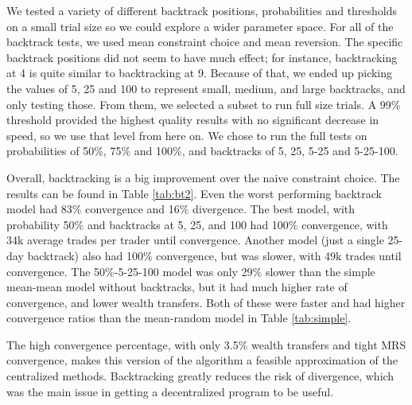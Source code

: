 \documentclass[12pt,a4paper,titlepage]{article}
\newcommand{\co}[1]{\textsf{#1}}
\begin{document}
We tested a variety of different backtrack positions, probabilities and thresholds on a small trial size so we could explore a wider parameter space.
For all of the backtrack tests, we used \co{mean} constraint choice and \co{mean} reversion.
The specific backtrack positions did not seem to have much effect; for instance, backtracking at 4 is quite similar to backtracking at 9. 
Because of that, we ended up picking the values of 5, 25 and 100 to represent small, medium, and large backtracks, and only testing those.
From them, we selected a subset to run full size trials.
A 99\% threshold provided the highest quality results with no significant decrease in speed, so we use that level from here on.
We chose to run the full tests on probabilities of 50\%, 75\% and 100\%, and backtracks of 5, 25, 5-25 and 5-25-100. 

Overall, backtracking is a big improvement over the naive constraint choice.
The results can be found in Table \ref{tab:bt2}.
Even the worst performing backtrack model had 83\% convergence and 16\% divergence.
The best model, with probability 50\% and backtracks at 5, 25, and 100 had 100\% convergence, with 34k average trades per trader until convergence.
Another model (just a single 25-day backtrack) also had 100\% convergence, but was slower, with 49k trades until convergence.
The 50\%-5-25-100 model was only 29\% slower than the simple \co{mean}-\co{mean} model without backtracks, but it had much higher rate of convergence, and lower wealth transfers.
Both of these were faster and had higher convergence ratios than the \co{mean}-\co{random} model in Table \ref{tab:simple}.

The high convergence percentage, with only 3.5\% wealth transfers and tight MRS convergence, makes this version of the algorithm a feasible approximation of the centralized methods. 
Backtracking greatly reduces the risk of divergence, which was the main issue in getting a decentralized program to be useful.
\end{document}
